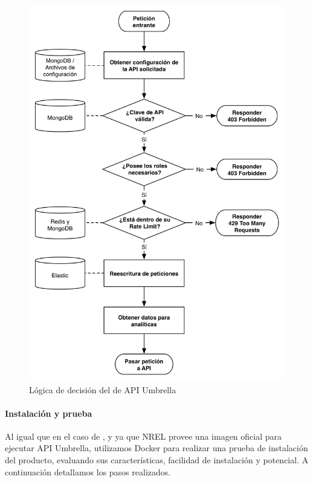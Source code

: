 \begin{figure}
  \includegraphics[width=\linewidth]{src/images/03-capitulo-3/tecnologias/api-umbrella/api-umbrella-gatekeeper.png}
  \caption{Lógica de decisión del  de API Umbrella}
  \label{fig:api-umbrella-gatekeeper}
\end{figure}

\paragraph{Instalación y prueba}

Al igual que en el caso de , y ya que NREL provee una imagen oficial para ejecutar API Umbrella, utilizamos Docker para realizar una prueba de instalación del producto, evaluando sus características, facilidad de instalación y potencial. A continuación detallamos los pasos realizados.

